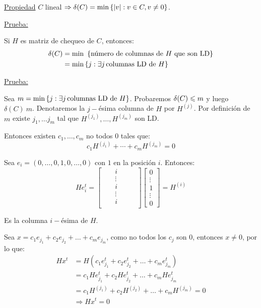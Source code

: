 \documentclass[12pt,a4paper]{article}
\begin{document}
\underline{Propiedad} $C$ lineal $\Rightarrow \delta(C) = \min \left\lbrace |v|: v\in C, v\neq 0 \right\rbrace$.
\medskip

\underline{Prueba:}
\begin{teorema} Si $H$ es matriz de chequeo de $C$, entonces:
    \begin{align*}
        \delta(C) &= \min\,\,\left\lbrace \text{número de columnas de $H$ que son LD} \right\rbrace\\
        &= \min \left\lbrace j: \exists j\,\text{columnas LD de $H$} \right\rbrace
    \end{align*}
\end{teorema}

\underline{Prueba:}
\medskip

Sea $m = \min \left\lbrace j: \exists j\,\text{columnas LD de $H$} \right\rbrace$. Probaremos 
$\delta(C) \leqslant m$ y luego $\delta(C) \> m$. Denotaremos la $j-$ésima columna de $H$ 
por $H^{(j)}$. Por definición de $m$ existe $j_{1},\ldots j_{m}$ tal que 
$H^{(j_{1})},\ldots, H^{(j_{m})}$ son LD.
\medskip

Entonces existen $c_{1},\ldots, c_{m}$ no todos $0$ tales que:
$$c_{1}H^{(j_{1})} + \cdots + c_{m}H^{(j_{m})} = 0$$

Sea $e_{i} = (0,\ldots,0,1,0,\ldots,0)$ con $1$ en la posición $i$. Entonces:
\begin{equation*}
    He_{i}^{t} =
    \begin{bmatrix}
        &   & i      &   &   & \\
        &   & \vdots &   &   & \\
        &   & i      &   &   & \\
        &   & \vdots &   &   & \\
        &   & i      &   &   & \\
    \end{bmatrix}
    \begin{bmatrix}
        0\\
        \vdots\\
        1\\
        \vdots\\
        0
    \end{bmatrix}
    =
    H^{(i)}
\end{equation*}

Es la columna $i-$ésima de $H$.
\medskip

Sea $x = c_{1}e_{j_{1}}+c_{2}e_{j_{2}}+\ldots + c_{m}e_{j_{m}}$, como no todos
los $c_{j}$ son $0$, entonces $x \neq 0$, por lo que:
\begin{align*}
    Hx^{t} &= H(c_{1}e_{j_{1}}^{t}+c_{2}e_{j_{2}}^{t}+\ldots + c_{m}e_{j_{m}}^{t})\\
    &= c_{1}He_{j_{1}}^{t}+c_{2}He_{j_{2}}^{t}+\ldots + c_{m}He_{j_{m}}^{t} \\
    &= c_{1}H^{(j_{1})} + c_{2}H^{(j_{2})} +\ldots + c_{m}H^{(j_{m})} = 0\\
    &\Rightarrow Hx^{t} = 0 
\end{align*}
\end{document}
